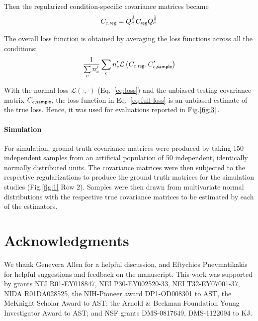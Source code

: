 \documentclass[10pt]{article}
\newcommand{\figref}[2]{Fig.\;\ref{fig:#1}\,#2}
\newcommand{\loss}[1]{\mathcal L\left(#1\right)}
\begin{document}
Then the regularized condition-specific covariance matrices became
\begin{equation}
	C_{c,\sf reg} = Q_c^{\frac 1 2} C_{\sf reg} Q_c^{\frac 1 2} 
\end{equation}

The overall loss function is obtained by averaging the loss functions across all the conditions:
\begin{equation}\label{eq:full-loss}
	\frac 1 {\sum\limits_c n_c^\prime}\sum\limits_c n_c^\prime \loss{C_{c,\sf reg}, C_{c,\sf sample}^\prime} 
\end{equation}

With the normal loss $\loss{\cdot,\cdot}$ (Eq.~\ref{eq:loss}) and the unbiased testing covariance matrix $C_{c,\sf sample}$, the loss function in Eq.~\ref{eq:full-loss} is an unbiased estimate of the true loss. Hence, it was used for evaluations reported in \figref{3}. 

\paragraph{Simulation}
For simulation, ground truth covariance matrices were produced by taking 150 independent samples from an artificial population of 50 independent, identically normally distributed units. The covariance matrices were then subjected to the respective regularizations to produce the ground truth matrices for the simulation studies (\figref{1}{\,Row 2}). Samples were then drawn from multivariate normal distributions with the respective true covariance matrices to be estimated by each of the estimators. 

\section*{Acknowledgments}
We thank Genevera Allen for a helpful discussion, and Eftychios Pnevmatikakis for helpful suggestions and feedback on the manuscript.  This work was supported by grants NEI R01-EY018847, NEI P30-EY002520-33, NEI T32-EY07001-37, NIDA R01DA028525, the NIH-Pioneer award DP1-OD008301 to AST, the McKnight Scholar Award to AST; the Arnold \& Beckman Foundation Young Investigator Award to AST; and NSF grants DMS-0817649, DMS-1122094 to KJ.



\newpage
\end{document}
